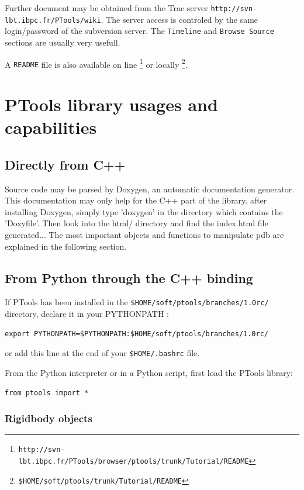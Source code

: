 \documentclass[12pt,a4paper]{article}
\begin{document}
Further document may be obtained from the Trac server {\tt http://svn-lbt.ibpc.fr/PTools/wiki}. 
The server access is controled by the same login/password of the subversion server. The {\tt Timeline}
and {\tt Browse Source} sections are usually very usefull.

A {\tt README} file is also available on line 
\footnote{\tt http://svn-lbt.ibpc.fr/PTools/browser/ptools/trunk/Tutorial/README} 
or locally \footnote{\tt \$HOME/soft/ptools/trunk/Tutorial/README}.


\section{PTools library usages and capabilities}

\subsection{Directly from C++}

Source code may be parsed by Doxygen, an automatic documentation generator.
This documentation may only help for the C++ part of the library.
after installing Doxygen, simply type 'doxygen' in the directory which contains the 'Doxyfile'.
Then look into the html/ directory and find the index.html file generated...
The most important objects and functions to manipulate pdb are explained in the following section.

\subsection{From Python through the C++ binding}

If PTools has been installed in the {\tt \$HOME/soft/ptools/branches/1.0rc/} directory, 
declare it in your PYTHONPATH :

\begin{verbatim}
export PYTHONPATH=$PYTHONPATH:$HOME/soft/ptools/branches/1.0rc/
\end{verbatim}
or add this line at the end of your {\tt \$HOME/.bashrc} file.


From the Python interpreter or in a Python script, first load the PTools library:
\begin{verbatim}
from ptools import *
\end{verbatim}


\subsubsection{Rigidbody objects}
\end{document}

